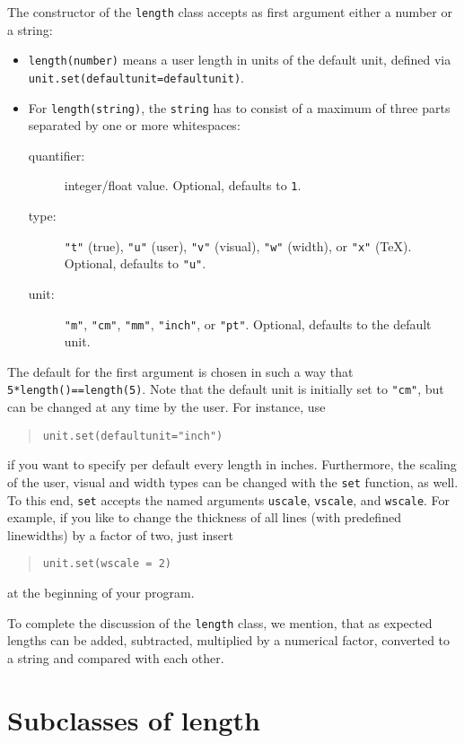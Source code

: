 The constructor of the \verb|length| class accepts as first argument
either a number or a string:
\begin{itemize}
\item \verb|length(number)| means a user length in units of the default
unit, defined via \verb|unit.set(defaultunit=defaultunit)|.
\item For \verb|length(string)|, the \verb|string| has to consist of a
  maximum of three parts separated by one or more whitespaces:
\begin{description}
\item[quantifier:] integer/float value. Optional, defaults to \verb|1|.
\item[type:] \verb|"t"| (true), \verb|"u"| (user), \verb|"v"|
  (visual), \verb|"w"| (width),
  or \verb|"x"| (TeX).
  Optional, defaults to \verb|"u"|.
\item[unit:] \verb|"m"|, \verb|"cm"|, \verb|"mm"|, \verb|"inch"|, or
  \verb|"pt"|. Optional, defaults to the default unit.
\end{description}
\end{itemize}
The default for the first argument is chosen in such a way that
\texttt{5*length()==length(5)}.  Note that the default unit  is
initially set to \verb|"cm"|, but can be changed at any time by the
user. For instance, use
\begin{quote}
\begin{verbatim}
unit.set(defaultunit="inch")
\end{verbatim}
\end{quote}
if you want to specify per default every length in inches.
Furthermore, the scaling of the user, visual and width types can be
changed with the \verb|set| function, as well. To this end, \verb|set|
accepts the named arguments \verb|uscale|, \verb|vscale|, and
\verb|wscale|. For example, if you like to change the thickness of all
lines (with predefined linewidths) by a factor of two, just insert
\begin{quote}
\begin{verbatim}
unit.set(wscale = 2)
\end{verbatim}
\end{quote}
at the beginning of your program.

To complete the discussion of the \verb|length| class, we mention,
that as expected \PyX{} lengths can be added, subtracted, multiplied by
a numerical factor, converted to a string and compared with each other.

\section{Subclasses of length}

